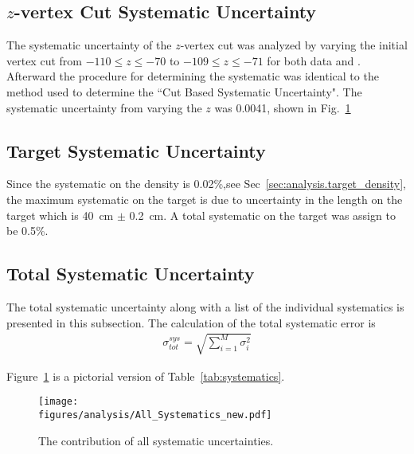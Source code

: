 					\subsection{$z$-vertex Cut Systematic Uncertainty}
 					The systematic uncertainty of the $z$-vertex cut was analyzed by varying the initial vertex cut from $-110 \le z \le -70$ to $-109 \le z \le -71$ for both data and . Afterward the procedure for determining the systematic was identical to the method used to determine the ``Cut Based Systematic Uncertainty". The systematic uncertainty from varying the $z$ was 0.0041, shown in Fig.~\ref{fig:results.syserr}
 					
 					\subsection{Target Systematic Uncertainty}
 					Since the systematic on the density is 0.02\%,see Sec~\ref{sec:analysis.target_density}, the maximum systematic on the target is due to uncertainty in the length on the target which is 40~cm $\pm$ 0.2~cm. A total systematic on the target was assign to be 0.5\%. 
 					
 					\subsection{Total Systematic Uncertainty}
 					The total systematic uncertainty along with a list of the individual systematics is presented in this subsection. The calculation of the total systematic error is 
 					\begin{align}
 						\sigma^{sys}_{tot} = \sqrt{\sum_{i=1}^{M}\sigma_i^2}
 					\end{align}
 					
 					Figure~\ref{fig:results.syserr} is a pictorial version of Table~\ref{tab:systematics}.
 					\begin{figure}[h!]\begin{center}
 							\texttt{[image: \\figures/analysis/All\_Systematics\_new.pdf]}
 							\caption[The contribution of all systematic uncertainties]{\label{fig:results.syserr}The contribution of all systematic uncertainties.}
 						\end{center}\end{figure} 
